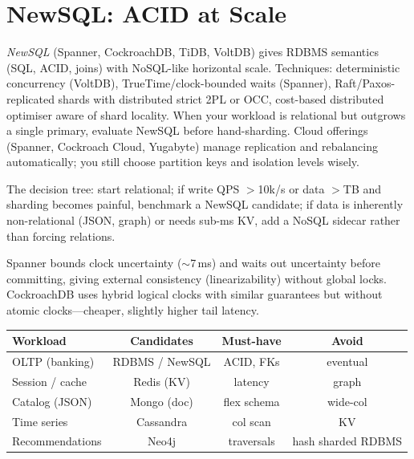 \section{NewSQL: ACID at Scale}
\label{sec:newsql}

\emph{NewSQL} (Spanner, CockroachDB, TiDB, VoltDB) gives RDBMS semantics (SQL, ACID, joins) with NoSQL-like horizontal scale. Techniques: deterministic concurrency (VoltDB), TrueTime/clock-bounded waits (Spanner), Raft/Paxos-replicated shards with distributed strict 2PL or OCC, cost-based distributed optimiser aware of shard locality. When your workload is relational but outgrows a single primary, evaluate NewSQL before hand-sharding. Cloud offerings (Spanner, Cockroach Cloud, Yugabyte) manage replication and rebalancing automatically; you still choose partition keys and isolation levels wisely.

The decision tree: start relational; if write QPS $>$10k/s or data $>$TB and sharding becomes painful, benchmark a NewSQL candidate; if data is inherently non-relational (JSON, graph) or needs sub-ms KV, add a NoSQL sidecar rather than forcing relations.

\begin{remark}
Spanner bounds clock uncertainty ($\sim$7\,ms) and waits out uncertainty before committing, giving external consistency (linearizability) without global locks. CockroachDB uses hybrid logical clocks with similar guarantees but without atomic clocks---cheaper, slightly higher tail latency.
\end{remark}

\begin{remark}
\begin{tabular}{@{}lccc@{}} \toprule Workload & Candidates & Must-have & Avoid \\ \midrule OLTP (banking) & RDBMS / NewSQL & ACID, FKs & eventual \\ \midrule Session / cache & Redis (KV) & latency & graph \\ \midrule Catalog (JSON) & Mongo (doc) & flex schema & wide-col \\ \midrule Time series & Cassandra & col scan & KV \\ \midrule Recommendations & Neo4j & traversals & hash sharded RDBMS \\ \bottomrule \end{tabular}
\end{remark}

